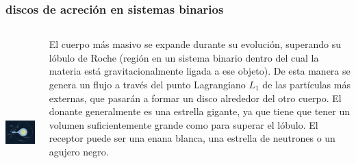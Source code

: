 \documentclass{beamer}
\begin{document}
\begin{frame}
\frametitle{discos de acreción en sistemas binarios}
\begin{columns}
\begin{column}{0.6\textwidth}
\hspace*{-0.4cm}
\includegraphics[width=9.0cm, height=7.3cm]{pulsar.jpg}
\end{column}
\hspace*{1.9cm}
\begin{column}{0.3\textwidth}
\scriptsize
\justify
\vspace*{-0.5cm}
El cuerpo más masivo se expande durante su evolución, superando su
lóbulo de Roche (región en un sistema binario dentro del cual la
materia está gravitacionalmente ligada a ese objeto). De esta manera
se genera un flujo a través del punto Lagrangiano $L_{1}$
de las partículas más externas, que pasarán a formar un disco
alrededor del otro cuerpo. El donante generalmente es una estrella 
gigante, ya que tiene que tener un volumen suficientemente grande
como para superar el lóbulo. El receptor puede ser una enana blanca,
una estrella de neutrones o un agujero negro.
\end{column}
\end{columns}
\end{frame}
\end{document}
